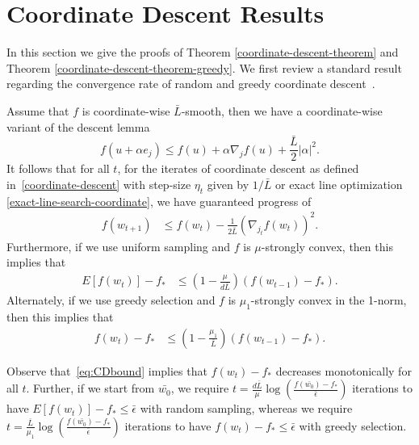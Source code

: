 \documentclass[10pt]{article} %
\begin{document}
\section{Coordinate Descent Results}\label{coordinate-descent-proof}


In this section we give the proofs of Theorem \ref{coordinate-descent-theorem} and Theorem \ref{coordinate-descent-theorem-greedy}. We first review a standard result regarding the convergence rate of random and greedy coordinate descent~\cite{nesterov2012cd,nutini2015coordinate}. %


\begin{lemma}
\label{lem:coordinate}
Assume that $f$ is coordinate-wise $\bar{L}$-smooth, then we have a coordinate-wise variant of the descent lemma
    \begin{equation*}
        f(u + \alpha e_{j}) \leq f(u) +
        \alpha \nabla_j f(u) + \frac{\bar{L}}{2}|\alpha|^2.
    \end{equation*}
It follows that for all $t$, for the iterates of coordinate descent as defined in~\eqref{coordinate-descent} with step-size $\eta_t$ given by $1/\bar{L}$ or exact line optimization \eqref{exact-line-search-coordinate}, we have guaranteed progress of
    \begin{align}
        f(w_{t+1}) 
        &\leq f(w_{t}) - \frac{1}{2\bar{L}}(\nabla_{j_{t}} f(w_{t}))^2.
        \label{eq:CDbound}
    \end{align}
Furthermore, if we use uniform sampling and $f$ is $\mu$-strongly convex, then this implies that
    \begin{align*}
        E[f(w_{t})] - f_*
        &\leq \left(1 - \frac{\mu}{d\bar{L}}\right)(f(w_{t-1}) - f_*).
    \end{align*}  
Alternately, if we use greedy selection and $f$ is $\mu_1$-strongly convex in the 1-norm, then this implies that
\begin{align*}
f(w_{t}) - f_*
        &\leq \left(1 - \frac{\mu_1}{\bar{L}}\right)(f(w_{t-1}) - f_*).
        \end{align*}
\end{lemma}
Observe that~\eqref{eq:CDbound} implies that $f(w_{t}) - f_{*}$ decreases monotonically for all $t$. Further,  if we start from $\bar{w_0}$, we require $t = \frac{d\bar{L}}{\mu}\log\left(\frac{f(\bar{w_{0}}) - f_{*}}{\bar{\epsilon}}\right)$ iterations to have $E[f(w_{t})] - f_{*} \leq \bar{\epsilon}$ with random sampling, whereas we require $t = \frac{\bar{L}}{\mu_1}\log\left(\frac{f(\bar{w_{0}}) - f_{*}}{\bar{\epsilon}}\right)$ iterations to have $f(w_{t}) - f_{*} \leq \bar{\epsilon}$ with greedy selection.
\end{document}
